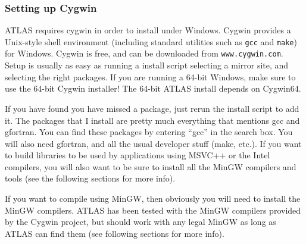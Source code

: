 \documentclass[11pt]{article}
\begin{document}
\subsubsection{Setting up Cygwin}
ATLAS requires cygwin in order to install under Windows.  Cygwin
provides a Unix-style shell environment (including standard utilities such as
{\tt gcc} and {\tt make}) for Windows.
Cygwin is free, and can be downloaded from {\tt www.cygwin.com}.  
Setup is usually as easy as running a install script selecting a mirror
site, and selecting the right packages.  If you are running a 64-bit Windows,
make sure to use the 64-bit Cygwin installer!  The 64-bit ATLAS install
depends on Cygwin64.

If you have found you have
missed a package, just rerun the install script to add it.  The packages
that I install are pretty much everything that mentions gcc and gfortran.
You can find these packages by entering ``gcc'' in the search box.  
You will also need gfortran, and all the usual developer stuff (make, etc.).
If you want to build libraries to be used by applications using MSVC++
or the Intel compilers, you will also want to be sure to install all the
MinGW compilers and tools (see the following sections for more info).

If you want to compile using MinGW, then obviously you will need to install
the MinGW compilers.  ATLAS has been tested with the MinGW compilers provided
by the Cygwin project, but should work with any legal MinGW as long as 
ATLAS can find them (see following sections for more info).

\end{document}
